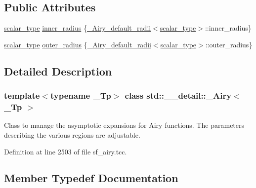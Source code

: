 \subsection*{Public Attributes}
\begin{DoxyCompactItemize}
\item 
\hyperlink{classstd_1_1____detail_1_1__Airy_a4b2b920ead7adcf08d49420c24e491b5}{scalar\+\_\+type} \hyperlink{classstd_1_1____detail_1_1__Airy_ae619970f4c54b7f80340f05b7ead83e1}{inner\+\_\+radius} \{\hyperlink{structstd_1_1____detail_1_1__Airy__default__radii}{\+\_\+\+Airy\+\_\+default\+\_\+radii}$<$\hyperlink{classstd_1_1____detail_1_1__Airy_a4b2b920ead7adcf08d49420c24e491b5}{scalar\+\_\+type}$>$\+::inner\+\_\+radius\}
\item 
\hyperlink{classstd_1_1____detail_1_1__Airy_a4b2b920ead7adcf08d49420c24e491b5}{scalar\+\_\+type} \hyperlink{classstd_1_1____detail_1_1__Airy_af688e5d14ed305f95f0e9d9d58d3bf9a}{outer\+\_\+radius} \{\hyperlink{structstd_1_1____detail_1_1__Airy__default__radii}{\+\_\+\+Airy\+\_\+default\+\_\+radii}$<$\hyperlink{classstd_1_1____detail_1_1__Airy_a4b2b920ead7adcf08d49420c24e491b5}{scalar\+\_\+type}$>$\+::outer\+\_\+radius\}
\end{DoxyCompactItemize}


\subsection{Detailed Description}
\subsubsection*{template$<$typename \+\_\+\+Tp$>$\newline
class std\+::\+\_\+\+\_\+detail\+::\+\_\+\+Airy$<$ \+\_\+\+Tp $>$}

Class to manage the asymptotic expansions for Airy functions. The parameters describing the various regions are adjustable. 

Definition at line 2503 of file sf\+\_\+airy.\+tcc.



\subsection{Member Typedef Documentation}
\mbox{\label{classstd_1_1____detail_1_1__Airy_a4b2b920ead7adcf08d49420c24e491b5}} 
